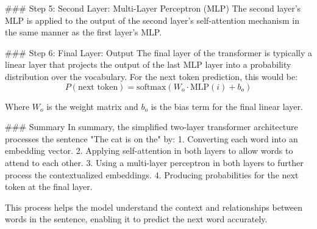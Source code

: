 ### Step 5: Second Layer: Multi-Layer Perceptron (MLP)
The second layer's MLP is applied to the output of the second layer's self-attention mechanism in the same manner as the first layer's MLP.

### Step 6: Final Layer: Output
The final layer of the transformer is typically a linear layer that projects the output of the last MLP layer into a probability distribution over the vocabulary. For the next token prediction, this would be:
\[ P(\text{next token}) = \text{softmax}(W_o \cdot \text{MLP}(i) + b_o) \]

Where \(W_o\) is the weight matrix and \(b_o\) is the bias term for the final linear layer.

### Summary
In summary, the simplified two-layer transformer architecture processes the sentence "The cat is on the" by:
1. Converting each word into an embedding vector.
2. Applying self-attention in both layers to allow words to attend to each other.
3. Using a multi-layer perceptron in both layers to further process the contextualized embeddings.
4. Producing probabilities for the next token at the final layer.

This process helps the model understand the context and relationships between words in the sentence, enabling it to predict the next word accurately.